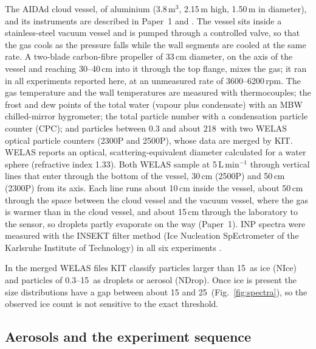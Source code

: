 The AIDAd cloud vessel, of aluminium (3.8\,m$^3$, 2.15\,m high, 1.50\,m in diameter), and its instruments are described in Paper~1 and \citet{Alpert2023}. The vessel sits inside a stainless-steel vacuum vessel and is pumped through a controlled valve, so that the gas cools as the pressure falls while the wall segments are cooled at the same rate. A two-blade carbon-fibre propeller of 33\,cm diameter, on the axis of the vessel and reaching 30--40\,cm into it through the top flange, mixes the gas; it ran in all experiments reported here, at an unmeasured rate of 3600--6200\,rpm. The gas temperature and the wall temperatures are measured with thermocouples; the frost and dew points of the total water (vapour plus condensate) with an MBW chilled-mirror hygrometer; the total particle number with a condensation particle counter (CPC); and particles between 0.3 and about 218\um\ with two WELAS optical particle counters (2300P and 2500P), whose data are merged by KIT. WELAS reports an optical, scattering-equivalent diameter calculated for a water sphere (refractive index 1.33). Both WELAS sample at 5\,L\,min$^{-1}$ through vertical lines that enter through the bottom of the vessel, 30\,cm (2500P) and 50\,cm (2300P) from its axis. Each line runs about 10\,cm inside the vessel, about 50\,cm through the space between the cloud vessel and the vacuum vessel, where the gas is warmer than in the cloud vessel, and about 15\,cm through the laboratory to the sensor, so droplets partly evaporate on the way (Paper~1). INP spectra were measured with the INSEKT filter method (Ice Nucleation SpEctrometer of the Karlsruhe Institute of Technology) in all six experiments .

In the merged WELAS files KIT classify particles larger than 15\um\ as ice (NIce) and particles of 0.3--15\um\ as droplets or aerosol (NDrop). Once ice is present the size distributions have a gap between about 15 and 25\um\ (Fig.~\ref{fig:spectra}), so the observed ice count is not sensitive to the exact threshold. 

\subsection{Aerosols and the experiment sequence}


